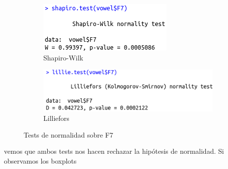 \begin{figure}[H]
	\centering
	\begin{subfigure}{.5\textwidth}
		\centering
		\includegraphics[width=.7\linewidth]{sw-F7.png}
		\caption{Shapiro-Wilk}
		\label{fig:sw-F7}
	\end{subfigure}%
	\begin{subfigure}{.5\textwidth}
		\centering
		\includegraphics[width=.7\linewidth]{l-F7.png}
		\caption{Lilliefors}
		\label{fig:l-F7}
	\end{subfigure}
	\caption{Tests de normalidad sobre F7}
	\label{fig:normF7}
\end{figure}

vemos que ambos tests nos hacen rechazar la hipótesis de normalidad. Si observamos los boxplots

